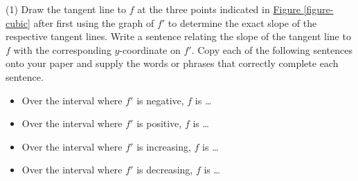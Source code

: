 \documentclass[10pt,oneside,]{book}
\theoremstyle{plain}
\theoremstyle{definition}
\numberwithin{equation}{section}
\newcounter{figstack}
\newcounter{figindex}
\newlength\fight
\newcommand\pushValignCaptionBottom[5][b]{%
\stepcounter{figstack}%
\expandafter\def\csname %
figalign\romannumeral\value{figstack}\endcsname{#1}%
\expandafter\def\csname %
figtype\romannumeral\value{figstack}\endcsname{#2}%
\expandafter\def\csname %
figwd\romannumeral\value{figstack}\endcsname{#3}%
\expandafter\def\csname %
figcontent\romannumeral\value{figstack}\endcsname{#4}%
\expandafter\def\csname %
figcap\romannumeral\value{figstack}\endcsname{#5}%
\setbox0=\hbox{%
\begin{#2}{#3}#4\end{#2}}%
\ifdim\dimexpr\ht0+\dp0\relax>\fight\global\setlength{\fight}{%
\dimexpr\ht0+\dp0\relax}\fi%
}
\newcommand\popValignCaptionBottom{%
\setcounter{figindex}{0}%
\hfill%
\whiledo{\value{figindex}<\value{figstack}}{%
\stepcounter{figindex}%
\def\tmp{\csname figwd\romannumeral\value{figindex}\endcsname}%
\begin{\csname figtype\romannumeral\value{figindex}\endcsname}[t]{\tmp}%
\centering%
\stackinset{c}{}%
{\csname figalign\romannumeral\value{figindex}\endcsname}{}%
{\csname figcontent\romannumeral\value{figindex}\endcsname}%
{\rule{0pt}{\fight}}\par%
\csname figcap\romannumeral\value{figindex}\endcsname%
\end{\csname figtype\romannumeral\value{figindex}\endcsname}%
\hfill%
}%
\setcounter{figstack}{0}%
\setlength{\fight}{0pt}%
\hfill%
}
\newcommand{\fe}[2]{#1\mathopen{}\left(#2\right)\mathclose{}}
\newcommand{\fd}[1]{#1'}
\begin{document}
\par
\begin{exercisegroup}(1)
\exercise[7.]\hypertarget{exercise-235}{\null}Draw the tangent line to \(f\) at the three points indicated in \hyperref[figure-cubic]{Figure \ref{figure-cubic}} after first using the graph of \(\fd{f}\) to determine the exact slope of the respective tangent lines.%
\exercise[8.]\hypertarget{exercise-236}{\null}Write a sentence relating the slope of the tangent line to \(f\) with the corresponding \(y\)-coordinate on \(\fd{f}\).%
\exercise[9.]\hypertarget{exercise-237}{\null}Copy each of the following sentences onto your paper and supply the words or phrases that correctly complete each sentence.%
\begin{itemize}[label=\textbullet]
\item{}Over the interval where \(\fd{f}\) is negative, \(f\) is \dots{}%
\item{}Over the interval where \(\fd{f}\) is positive, \(f\) is \dots{}%
\item{}Over the interval where \(\fd{f}\) is increasing, \(f\) is \dots{}%
\item{}Over the interval where \(\fd{f}\) is decreasing, \(f\) is \dots{}%
\end{itemize}
\end{exercisegroup}
\end{document}
